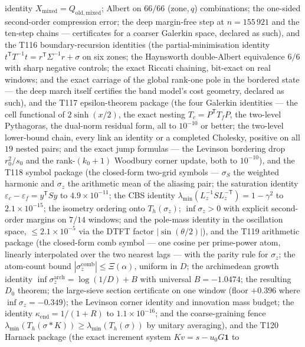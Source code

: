 \documentclass[11pt,a4paper]{article}
\begin{document}
\begin{keybox}
identity $X_{\mathrm{mixed}}=Q_{\mathrm{old,mixed}}$; Albert on $66/66$ (zone,\,$q$) combinations;
the one-sided second-order compression error; the deep margin-free step at $n=155\,921$ and the
ten-step chains --- certificates for a coarser Galerkin space, declared as such), and the T116
boundary-recursion identities (the partial-minimisation identity
$t^{\mathsf T}T^{-1}t=r^{\mathsf T}\Sigma^{-1}r+\sigma$ on six zones; the Haynsworth
double-Albert equivalence $6/6$ with sharp negative controls; the exact Riccati chaining,
bit-exact on real windows; and the exact carriage of the global rank-one pole in the bordered
state --- the deep march itself certifies the band model's cost geometry, declared as such),
and the T117 epsilon-theorem package (the four Galerkin identities --- the cell functional of
$2\sinh(x/2)$, the exact nesting $T_c=P^{\mathsf T}T_fP$, the two-level Pythagoras, the
dual-norm residual form, all to $10^{-10}$ or better; the two-level lower-bound chain, every
link an identity or a completed Cholesky, positive on all $19$ nested pairs; and the exact jump
formulas --- the Levinson bordering drop $r_0^2/s_0$ and the rank-$(k_0{+}1)$ Woodbury corner
update, both to $10^{-10}$), and the T118 symbol package (the closed-form two-grid symbols ---
$\sigma_S$ the weighted harmonic and $\sigma_z$ the arithmetic mean of the aliasing pair; the
saturation identity $\varepsilon_c-\varepsilon_f=y^{\mathsf T}Sy$ to $4.9\times10^{-11}$; the
CBS identity $\lambda_{\min}(L_z^{-1}SL_z^{-\mathsf T})=1-\gamma^2$ to $2.1\times10^{-15}$; the
isometry ordering onto $T_h(\sigma_z)$; $\inf\sigma_z>0$ with explicit second-order margins on
$7/14$ windows; and the pole-mass identity in the oscillation space, $\le2.1\times10^{-5}$ via
the DTFT factor $|\sin(\theta/2)|$), and the T119 arithmetic package (the closed-form comb
symbol --- one cosine per prime-power atom, linearly interpolated over the two nearest lags
--- with the parity rule for $\sigma_z$; the atom-count bound
$|\sigma_z^{\mathrm{comb}}|\le\Xi(\alpha)$, uniform in $D$; the archimedean growth identity
$\inf\sigma_z^{\mathrm{arch}}=\log(1/D)+B$ with universal $B=-1.0474$; the resulting $D_0$
theorem; the large-sieve section certificate on one window (floor $+0.396$ where
$\inf\sigma_z=-0.349$); the Levinson corner identity and innovation mass budget; the identity
$\kappa_{\mathrm{end}}=1/(1+R)$ to $1.1\times10^{-16}$; and the coarse-graining fence
$\lambda_{\min}(T_h(\sigma*K))\ge\lambda_{\min}(T_h(\sigma))$ by unitary averaging), and the
T120 Harnack package (the exact increment system $Kv=s-u_0G\mathbf 1$ to

\end{keybox}
\end{document}
